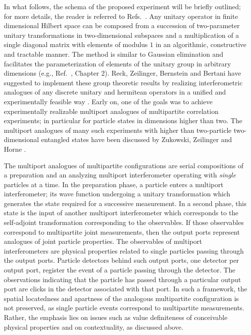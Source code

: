 \documentclass[12pt]{iopart}
\begin{document}
In what follows, the schema of the proposed experiment will be briefly outlined;
for more details, the reader is referred to Refs.~\cite{rzbb,zukowski-97}.
Any unitary operator in finite dimensional Hilbert space
can be composed from a succession of two-parameter unitary transformations in
two-dimensional subspaces
and a multiplication of a single diagonal matrix with elements of modulus $1$
in an algorithmic, constructive and tractable manner.
The method is similar to Gaussian elimination and facilitates the parameterization of elements
of the unitary group  in arbitrary dimensions (e.g., Ref.~\cite{murnaghan}, Chapter 2).
Reck, Zeilinger, Bernstein and Bertani have suggested to implement
these group theoretic results by realizing interferometric analogues
of any discrete unitary and hermitean operators
in a unified and experimentally feasible way \cite{rzbb,reck-94}.
Early on, one of the goals was to achieve experimentally realizable
multiport analogues of multipartite correlation experiments; in particular
for particle states in dimensions higher than two.
The multiport analogues of many such experiments with higher than
two-particle two-dimensional entangled states have been discussed by
Zukowski, Zeilinger and Horne
\cite{zukowski-97}.

The multiport analogues of multipartite configurations
are serial compositions of a preparation and an analyzing multiport interferometer
operating with {\em single} particles at a time.
In the preparation phase, a particle enters a multiport interferometer;
its wave function undergoing a unitary transformation which generates the
state required for a successive measurement.
In a second phase, this state is the input of another multiport interferometer
which corresponds to the self-adjoint transformation corresponding to the observables.
If those observables correspond to multipartite joint measurements, then
the output ports represent analogues of joint particle properties.
The observables of multiport interferometers are
physical properties related to single particles passing through
the output ports.
Particle detectors behind such output ports, one detector per output port,
register the event of
a particle passing through the detector.
The observations indicating that the particle has passed
through a particular output port are clicks in the detector associated with that port.
In such a framework,
the spatial locatedness and apartness of the analogous multipartite configuration
is not preserved,
as single particle events correspond to multipartite measurements.
Rather, the emphasis lies on issues such as value definiteness of conceivable physical properties
and  on contextuality, as discussed above.
\end{document}
